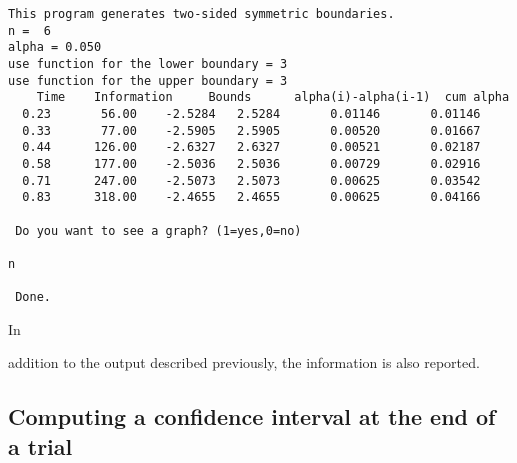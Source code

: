 {{\begin{verbatim}
This program generates two-sided symmetric boundaries.
n =  6
alpha = 0.050
use function for the lower boundary = 3
use function for the upper boundary = 3
    Time    Information     Bounds      alpha(i)-alpha(i-1)  cum alpha
  0.23       56.00    -2.5284   2.5284       0.01146       0.01146
  0.33       77.00    -2.5905   2.5905       0.00520       0.01667
  0.44      126.00    -2.6327   2.6327       0.00521       0.02187
  0.58      177.00    -2.5036   2.5036       0.00729       0.02916
  0.71      247.00    -2.5073   2.5073       0.00625       0.03542
  0.83      318.00    -2.4655   2.4655       0.00625       0.04166

 Do you want to see a graph? (1=yes,0=no)
                                                                             n

 Done.
\end{verbatim}} 
In} addition to the output described previously, the information is also
reported.



\subsection{Computing a confidence interval at the end of a trial}

